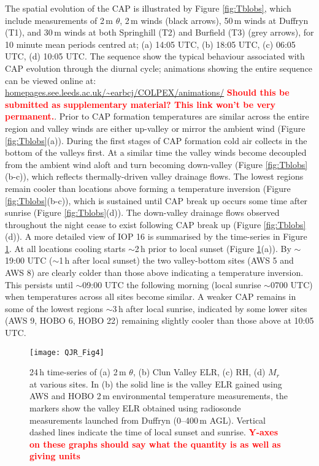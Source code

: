 \documentclass[times]{qjrms4}
\begin{document}
The spatial evolution of the CAP is illustrated by Figure \ref{fig:Tblobs}, which include measurements of 2$\,\mbox{m}$ $\theta$, 2$\,\mbox{m}$ winds (black arrows), 50$\,\mbox{m}$ winds at Duffryn (T1), and 30$\,\mbox{m}$ winds at both Springhill (T2) and Burfield (T3) (grey arrows), for 10 minute mean periods centred at; (a) 14:05 UTC, (b) 18:05 UTC, (c) 06:05 UTC, (d) 10:05 UTC. The sequence show the typical behaviour associated with CAP evolution through the diurnal cycle; animations showing the entire sequence can be viewed online at: \url{homepages.see.leeds.ac.uk/~earbcj/COLPEX/animations/} \textcolor{red}{\bf Should this be submitted as supplementary material? This link won't be very permanent.}. Prior to CAP formation temperatures are similar across the entire region and valley winds are either up-valley or mirror the ambient wind (Figure \ref{fig:Tblobs}(a)). During the first stages of CAP formation cold air collects in the bottom of the valleys first. At a similar time the valley winds become decoupled from the ambient wind aloft and turn becoming down-valley (Figure \ref{fig:Tblobs}(b-c)), which reflects thermally-driven valley drainage flows. The lowest regions remain cooler than locations above forming a temperature inversion (Figure \ref{fig:Tblobs}(b-c)), which is sustained until CAP break up occurs some time after sunrise (Figure \ref{fig:Tblobs}(d)). The down-valley drainage flows observed throughout the night cease to exist following CAP break up (Figure \ref{fig:Tblobs}(d)). A more detailed view of IOP 16 is summarised by the time-series in Figure \ref{fig:tseries}. At all locations cooling starts $\sim$2$\,\mbox{h}$ prior to local sunset (Figure \ref{fig:tseries}(a)). By $\sim$19:00 UTC ($\sim$1$\,\mbox{h}$ after local sunset) the two valley-bottom sites (AWS 5 and AWS 8) are clearly colder than those above indicating a temperature inversion. This persists until $\sim$09:00 UTC the following morning (local sunrise $\sim$0700 UTC) when temperatures across all sites become similar. A weaker CAP remains in some of the lowest regions $\sim$3$\,\mbox{h}$ after local sunrise, indicated by some lower sites (AWS 9, HOBO 6, HOBO 22) remaining slightly cooler than those above at 10:05 UTC.
        \begin{figure}
        \centering
        \texttt{[image: QJR\_Fig4]}
        \caption{24$\,\mbox{h}$ time-series of (a) 2$\,\mbox{m}$ $\theta$, (b) Clun Valley ELR, (c) RH, (d) $M_r$ at various sites. In (b) the solid line is the valley ELR gained using AWS and HOBO 2$\,\mbox{m}$ environmental temperature measurements, the markers show the valley ELR obtained using radiosonde measurements launched from Duffryn (0--400$\,\mbox{m}$ AGL). Vertical dashed lines indicate the time of local sunset and sunrise. \textcolor{red}{\bf Y-axes on these graphs should say what the quantity is as well as giving units}}
        \label{fig:tseries}
        \end{figure}
\end{document}
